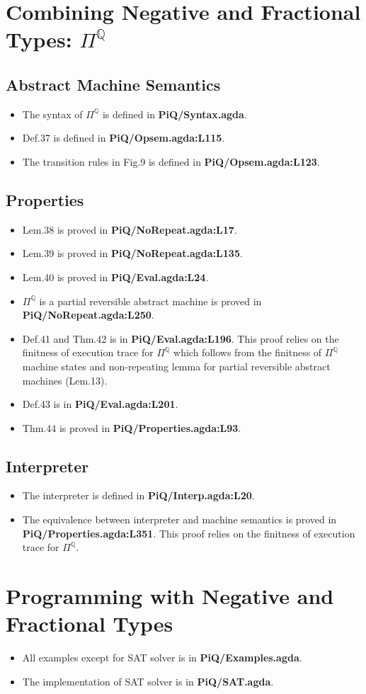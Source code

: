 \documentclass{article}
\begin{document}
\section{Combining Negative and Fractional Types: $\Pi^{\mathbb{Q}}$}
\subsection{Abstract Machine Semantics}
\begin{itemize}
\item The syntax of $\Pi^{\mathbb{Q}}$ is defined in \textbf{PiQ/Syntax.agda}.
\item Def.37 is defined in \textbf{PiQ/Opsem.agda:L115}.
\item The transition rules in Fig.9 is defined in \textbf{PiQ/Opsem.agda:L123}.
\end{itemize}

\subsection{Properties}
\begin{itemize}
\item Lem.38 is proved in \textbf{PiQ/NoRepeat.agda:L17}.
\item Lem.39 is proved in \textbf{PiQ/NoRepeat.agda:L135}.
\item Lem.40 is proved in \textbf{PiQ/Eval.agda:L24}.
\item $\Pi^{\mathbb{Q}}$ is a partial reversible abstract machine is proved in \textbf{PiQ/NoRepeat.agda:L250}.
\item Def.41 and Thm.42 is in \textbf{PiQ/Eval.agda:L196}. This proof relies on the finitness of execution trace
  for $\Pi^{\mathbb{Q}}$ which follows from the finitness of $\Pi^{\mathbb{Q}}$ machine states and non-repeating lemma for partial
  reversible abstract machines (Lem.13).
\item Def.43 is in \textbf{PiQ/Eval.agda:L201}.
\item Thm.44 is proved in \textbf{PiQ/Properties.agda:L93}.
\end{itemize}

\subsection{Interpreter}
\begin{itemize}
\item The interpreter is defined in \textbf{PiQ/Interp.agda:L20}.
\item The equivalence between interpreter and machine semantics is proved in \textbf{PiQ/Properties.agda:L351}.
  This proof relies on the finitness of execution trace for $\Pi^{\mathbb{Q}}$.
\end{itemize}

\section{Programming with Negative and Fractional Types}
\begin{itemize}
\item All examples except for SAT solver is in \textbf{PiQ/Examples.agda}.
\item The implementation of SAT solver is in \textbf{PiQ/SAT.agda}.
\end{itemize}
\end{document}
